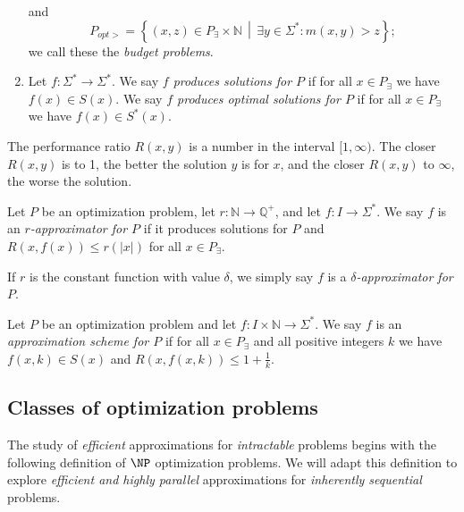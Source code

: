 \begin{definition}
\begin{enumerate}
\begin{displaymath}
    \end{displaymath}
    and
    \begin{displaymath}
      P_{opt>}=\left\{ (x, z) \in P_\exists \times \mathbb{N} \,\middle|\, \exists y \in \Sigma^* \colon m(x, y) > z \right\};
    \end{displaymath}
    we call these the \emph{budget problems}.
  \item Let $f \colon \Sigma^* \to \Sigma^*$.
    We say \emph{$f$ produces solutions for $P$} if for all $x \in P_\exists$ we have $f(x) \in S(x)$.
    We say \emph{$f$ produces optimal solutions for $P$} if for all $x \in P_\exists$ we have $f(x) \in S^*(x)$.
  \end{enumerate}
\end{definition}

The performance ratio $R(x, y)$ is a number in the interval $[1, \infty)$.
The closer $R(x, y)$ is to 1, the better the solution $y$ is for $x$, and the closer $R(x, y)$ to $\infty$, the worse the solution.

\begin{definition}
  Let $P$ be an optimization problem, let $r \colon \mathbb{N} \to \mathbb{Q}^+$, and let $f \colon I \to \Sigma^*$.
  We say $f$ is an \emph{$r$-approximator for $P$} if it produces solutions for $P$ and $R(x, f(x)) \leq r(|x|)$ for all $x \in P_\exists$.

  If $r$ is the constant function with value $\delta$, we simply say $f$ is a \emph{$\delta$-approximator for $P$}.
\end{definition}

\begin{definition}
  Let $P$ be an optimization problem and let $f \colon I \times \mathbb{N} \to \Sigma^*$.
  We say $f$ is an \emph{approximation scheme for $P$} if for all $x \in P_\exists$ and all positive integers $k$ we have $f(x, k)\in S(x)$ and $R(x, f(x, k)) \leq 1 + \frac{1}{k}$.
\end{definition}

\subsection{Classes of optimization problems}

The study of \emph{efficient} approximations for \emph{intractable} problems begins with the following definition of $\NP$ optimization problems.
We will adapt this definition to explore \emph{efficient and highly parallel} approximations for \emph{inherently sequential} problems.


